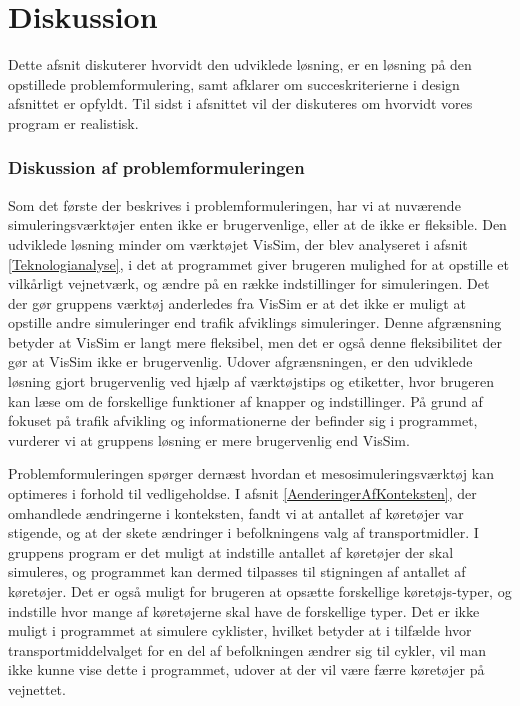\chapter{Diskussion}



Dette afsnit diskuterer hvorvidt den udviklede løsning, er en løsning på den opstillede problemformulering, samt afklarer om succeskriterierne i design afsnittet er opfyldt. Til sidst i afsnittet vil der diskuteres om hvorvidt vores program er realistisk.

\subsection*{Diskussion af problemformuleringen}\label{diskproblem}
Som det første der beskrives i problemformuleringen, har vi at nuværende simuleringsværktøjer enten ikke er brugervenlige, eller at de ikke er fleksible. Den udviklede løsning minder om værktøjet VisSim, der blev analyseret i afsnit \ref{Teknologianalyse}, i det at programmet giver brugeren mulighed for at opstille et vilkårligt vejnetværk, og ændre på en række indstillinger for simuleringen. Det der gør gruppens værktøj anderledes fra VisSim er at det ikke er muligt at opstille andre simuleringer end trafik afviklings simuleringer. Denne afgrænsning betyder at VisSim er langt mere fleksibel, men det er også denne fleksibilitet der gør at VisSim ikke er brugervenlig. Udover afgrænsningen, er den udviklede løsning gjort brugervenlig ved hjælp af værktøjstips og etiketter, hvor brugeren kan læse om de forskellige funktioner af knapper og indstillinger. På grund af fokuset på trafik afvikling og informationerne der befinder sig i programmet, vurderer vi at gruppens løsning er mere brugervenlig end VisSim.

\vspace{5mm}
Problemformuleringen spørger dernæst hvordan et mesosimuleringsværktøj kan optimeres i forhold til vedligeholdse. I afsnit \ref{AenderingerAfKonteksten}, der omhandlede ændringerne i konteksten, fandt vi at antallet af køretøjer var stigende, og at der skete ændringer i befolkningens valg af transportmidler. I gruppens program er det muligt at indstille antallet af køretøjer der skal simuleres, og programmet kan dermed tilpasses til stigningen af antallet af køretøjer. Det er også muligt for brugeren at opsætte forskellige køretøjs-typer, og indstille hvor mange af køretøjerne skal have de forskellige typer. Det er ikke muligt i programmet at simulere cyklister, hvilket betyder at i tilfælde hvor transportmiddelvalget for en del af befolkningen ændrer sig til cykler, vil man ikke kunne vise dette i programmet, udover at der vil være færre køretøjer på vejnettet. 

